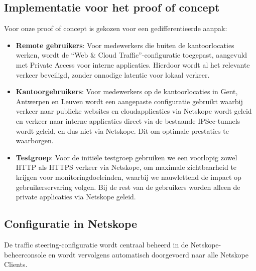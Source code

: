 \subsection{Implementatie voor het proof of concept}

Voor onze proof of concept is gekozen voor een gedifferentieerde aanpak:
\begin{itemize}
    \item \textbf{Remote gebruikers}: Voor medewerkers die buiten de kantoorlocaties werken, wordt de ``Web \& Cloud Traffic''-configuratie toegepast, aangevuld met Private Access voor interne applicaties. Hierdoor wordt al het relevante verkeer beveiligd, zonder onnodige latentie voor lokaal verkeer.

    \item \textbf{Kantoorgebruikers}: Voor medewerkers op de kantoorlocaties in Gent, Antwerpen en Leuven wordt een aangepaste configuratie gebruikt waarbij verkeer naar publieke websites en cloudapplicaties via Netskope wordt geleid en verkeer naar interne applicaties direct via de bestaande IPSec-tunnels wordt geleid, en dus niet via Netskope. Dit om optimale prestaties te waarborgen.

    \item \textbf{Testgroep}: Voor de initiële testgroep gebruiken we een voorlopig zowel HTTP als HTTPS verkeer via Netskope, om maximale zichtbaarheid te krijgen voor monitoringdoeleinden, waarbij we nauwlettend de impact op gebruikerservaring volgen. Bij de rest van de gebruikers worden alleen de private applicaties via Netskope geleid.
\end{itemize}
\subsection{Configuratie in Netskope}

De traffic steering-configuratie wordt centraal beheerd in de Netskope-beheerconsole en wordt vervolgens automatisch doorgevoerd naar alle Netskope Clients.

\vspace{2ex}

